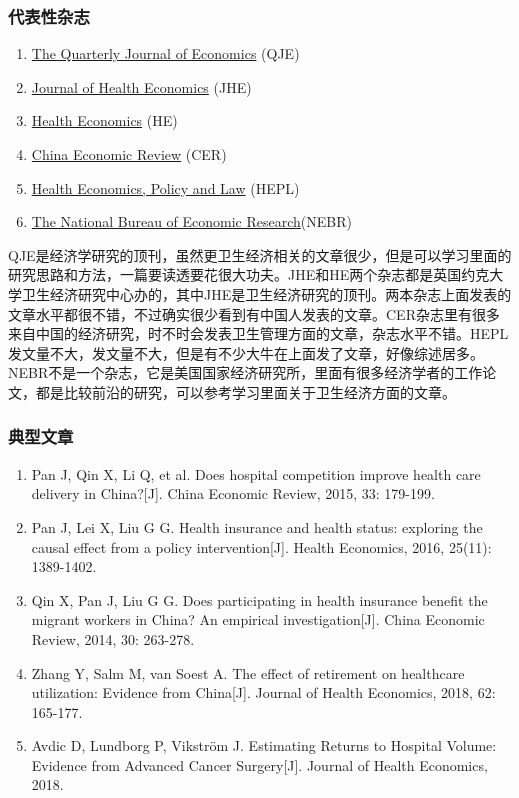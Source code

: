 \documentclass[11pt, a4paper]{article}
\begin{document}
\subsubsection{代表性杂志}
\begin{enumerate}[(1)]
	\item \href{https://academic.oup.com/qje/issue}{The Quarterly Journal of Economics} (QJE)
	\item \href{http://www.sciencedirect.com/science/journal/01676296}{Journal of Health Economics} (JHE)
	\item \href{http://onlinelibrary.wiley.com/journal/10.1002/(ISSN)1099-1050}{Health Economics} (HE)
	\item \href{https://www.sciencedirect.com/journal/china-economic-review}{China Economic Review} (CER)
	\item \href{https://www.cambridge.org/core/journals/health-economics-policy-and-law}{Health Economics, Policy and Law} (HEPL)
	\item \href{https://www.nber.org/}{The National Bureau of Economic Research}(NEBR)
\end{enumerate}

QJE是经济学研究的顶刊，虽然更卫生经济相关的文章很少，但是可以学习里面的研究思路和方法，一篇要读透要花很大功夫。JHE和HE两个杂志都是英国约克大学卫生经济研究中心办的，其中JHE是卫生经济研究的顶刊。两本杂志上面发表的文章水平都很不错，不过确实很少看到有中国人发表的文章。CER杂志里有很多来自中国的经济研究，时不时会发表卫生管理方面的文章，杂志水平不错。HEPL发文量不大，发文量不大，但是有不少大牛在上面发了文章，好像综述居多。NEBR不是一个杂志，它是美国国家经济研究所，里面有很多经济学者的工作论文，都是比较前沿的研究，可以参考学习里面关于卫生经济方面的文章。

\subsubsection{典型文章}

\begin{enumerate}[(1)]
	\item Pan J, Qin X, Li Q, et al. Does hospital competition improve health care delivery in China?[J]. China Economic Review, 2015, 33: 179-199.
	\item Pan J, Lei X, Liu G G. Health insurance and health status: exploring the causal effect from a policy intervention[J]. Health Economics, 2016, 25(11): 1389-1402.
	\item Qin X, Pan J, Liu G G. Does participating in health insurance benefit the migrant workers in China? An empirical investigation[J]. China Economic Review, 2014, 30: 263-278.
	\item Zhang Y, Salm M, van Soest A. The effect of retirement on healthcare utilization: Evidence from China[J]. Journal of Health Economics, 2018, 62: 165-177.
	\item Avdic D, Lundborg P, Vikström J. Estimating Returns to Hospital Volume: Evidence from Advanced Cancer Surgery[J]. Journal of Health Economics, 2018.
\end{enumerate}
\end{document}
